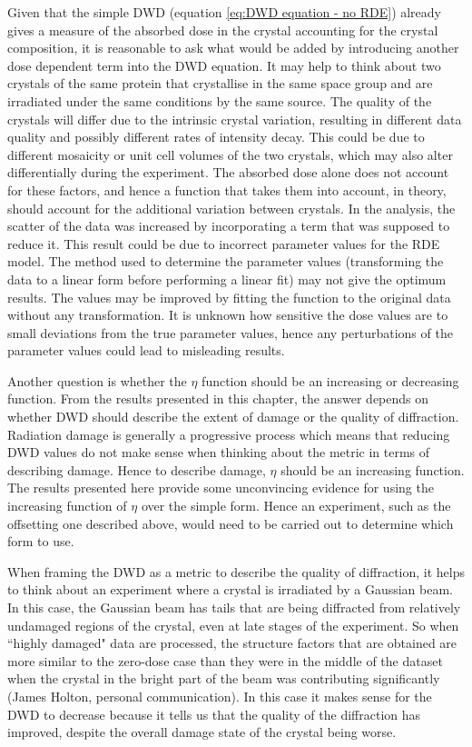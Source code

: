 Given that the simple DWD (equation \ref{eq:DWD equation - no RDE}) already gives a measure of the absorbed dose in the crystal accounting for the crystal composition, it is reasonable to ask what would be added by introducing another dose dependent term into the DWD equation.
It may help to think about two crystals of the same protein that crystallise in the same space group and are irradiated under the same conditions by the same source.
The quality of the crystals will differ due to the intrinsic crystal variation, resulting in different data quality and possibly different rates of intensity decay.
This could be due to different mosaicity or unit cell volumes of the two crystals, which may also alter differentially during the experiment.
The absorbed dose alone does not account for these factors, and hence a function that takes them into account, in theory, should account for the additional variation between crystals.
In the analysis, the scatter of the data was increased by incorporating a term that was supposed to reduce it.
This result could be due to incorrect parameter values for the RDE model.
The method used to determine the parameter values (transforming the data to a linear form before performing a linear fit) may not give the optimum results.
The values may be improved by fitting the function to the original data without any transformation.
It is unknown how sensitive the dose values are to small deviations from the true parameter values, hence any perturbations of the parameter values could lead to misleading results.

Another question is whether the $\eta$ function should be an increasing or decreasing function.
From the results presented in this chapter, the answer depends on whether DWD should describe the extent of damage or the quality of diffraction.
Radiation damage is generally a progressive process which means that reducing DWD values do not make sense when thinking about the metric in terms of describing damage.
Hence to describe damage, $\eta$ should be an increasing function.
The results presented here provide some unconvincing evidence for using the increasing function of $\eta$ over the simple form.
Hence an experiment, such as the offsetting one described above, would need to be carried out to determine which form to use.

When framing the DWD as a metric to describe the quality of diffraction, it helps to think about an experiment where a crystal is irradiated by a Gaussian beam.
In this case, the Gaussian beam has tails that are being diffracted from relatively undamaged regions of the crystal, even at late stages of the experiment.
So when ``highly damaged" data are processed, the structure factors that are obtained are more similar to the zero-dose case than they were in the middle of the dataset when the crystal in the bright part of the beam was contributing significantly (James Holton, personal communication).
In this case it makes sense for the DWD to decrease because it tells us that the quality of the diffraction has improved, despite the overall damage state of the crystal being worse.

